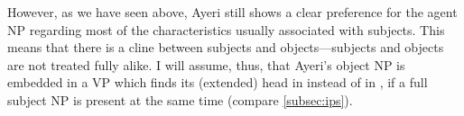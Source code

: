 However, as we have seen above, Ayeri still shows a clear preference for the
agent NP regarding most of the characteristics usually associated with
subjects. This means that there is a cline between subjects and
objects---subjects and objects are not treated fully alike. I will assume,
thus, that Ayeri's object NP is embedded in a VP which finds its (extended)
head in  instead of in , if a full subject NP is present at
the same time (compare \autoref{subsec:ips}).

